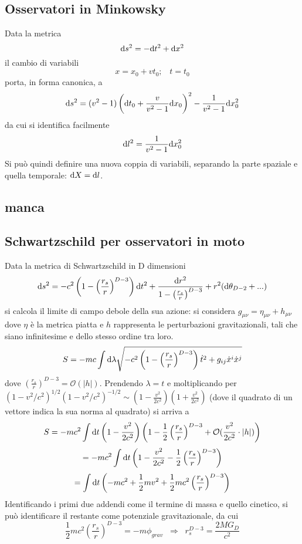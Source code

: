 \subsection{Osservatori in Minkowsky}
Data la metrica 
\[ \mathrm{d} s^2 = -\mathrm{d} t^2 + \mathrm{d} x^2 \]
il cambio di variabili
\[ x = x_0 + vt_0 ; \;\;\; t = t_0 \]
porta, in forma canonica, a 
\[ \mathrm{d} s ^2 = (v^2 -1)\left( \mathrm{d} t_0 + \frac{v}{v^2 -1} \mathrm{d} x_0\right)^2   - \frac{1}{v^2-1} \mathrm{d} x_0^2 \]
da cui si identifica facilmente
\[ \mathrm{d} l^2 = \frac{1}{v^2-1} \mathrm{d} x_0^2 \]
Si pu\`o quindi definire una nuova coppia di variabili, separando la parte spaziale e quella temporale: \( \mathrm{d} X = \mathrm{d} l \).



\subsection{manca}

\subsection{Schwartzschild per osservatori in moto}
Data la metrica di Schwartzschild in D dimensioni
\[  \mathrm{d} s^2 = -c^2 \left( 1- \left(\frac{r_s}{r}\right)^{D-3}\right) \mathrm{d} t^2 + \frac{\mathrm{d} r^2}{1- \left(\frac{r_s}{r}\right)^{D-3}} + r^2 (\mathrm{d} \theta_{D-2} + ...) \]
si calcola il limite di campo debole della sua azione: si considera \( g_{\mu\nu} = \eta_{\mu\nu} + h_{\mu\nu} \) dove $\eta$ \`e la metrica piatta e $h$ rappresenta le perturbazioni gravitazionali, tali che siano infinitesime e dello stesso ordine tra loro.
\[ S = -mc \int \mathrm{d} \lambda \sqrt{- c^2  \left( 1- \left(\frac{r_s}{r}\right)^{D-3} \right)  \dot{t}^2 + g_{ij} \dot{x}^i \dot{x}^j} \]
dove \( \left(\frac{r_s}{r}\right)^{D-3} = \mathcal{O}(|h|) \).
Prendendo \( \lambda = t \) e moltiplicando per 
\( (1-v^2/c^2)^{1/2} (1-v^2/c^2)^{-1/2} \sim \left(1-\frac{v^2}{2c^2}\right) \left(1+\frac{v^2}{2c^2}\right)\)
(dove il quadrato di un vettore indica la sua norma al quadrato) si arriva a 
\[ S = -mc^2 \int \mathrm{d} t  \left(1-\frac{v^2}{2c^2}\right) \left( 1 -\frac{1}{2} \left(\frac{r_s}{r}\right)^{D-3} + \mathcal{O}(\frac{v^2}{2c^2}\cdot |h|) \right) \]
\[ = -mc^2 \int \mathrm{d} t  \left(1-\frac{v^2}{2c^2} -\frac{1}{2} \left(\frac{r_s}{r}\right)^{D-3} \right)\]
\[ = \int \mathrm{d} t \left(  -mc^2  + \frac{1}{2}mv^2 + \frac{1}{2} mc^2\left(\frac{r_s}{r}\right)^{D-3} \right)\]
Identificando i primi due addendi come il termine di massa e quello cinetico, si pu\`o identificare il restante come potenziale gravitazionale, da cui
\[ \frac{1}{2} mc^2\left(\frac{r_s}{r}\right)^{D-3} = -m\phi_{grav} \;\;\Rightarrow \;\;r_s^{D-3} = \frac{2MG_D}{c^2} \]

